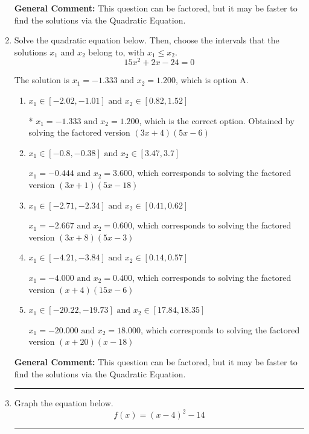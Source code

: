 \documentclass{extbook}[14pt]
\newcommand{\litem}[1]{\item #1

\rule{\textwidth}{0.4pt}}
\begin{document}
\begin{enumerate}
{\textbf{General Comment:} This question can be factored, but it may be faster to find the solutions via the Quadratic Equation.
}
\litem{
Solve the quadratic equation below. Then, choose the intervals that the solutions $x_1$ and $x_2$ belong to, with $x_1 \leq x_2$.
\[ 15x^{2} +2 x -24 = 0 \]

The solution is \( x_1 = -1.333 \text{ and } x_2 = 1.200 \), which is option A.\begin{enumerate}[label=\Alph*.]
\item \( x_1 \in [-2.02, -1.01] \text{ and } x_2 \in [0.82, 1.52] \)

* $x_1 = -1.333 \text{ and } x_2 = 1.200$, which is the correct option. Obtained by solving the factored version $(3x + 4)(5x -6)$
\item \( x_1 \in [-0.8, -0.38] \text{ and } x_2 \in [3.47, 3.7] \)

$x_1 = -0.444 \text{ and } x_2 = 3.600$, which corresponds to solving the factored version $(3x + 1)(5x -18)$
\item \( x_1 \in [-2.71, -2.34] \text{ and } x_2 \in [0.41, 0.62] \)

$x_1 = -2.667 \text{ and } x_2 = 0.600$, which corresponds to solving the factored version $(3x + 8)(5x -3)$
\item \( x_1 \in [-4.21, -3.84] \text{ and } x_2 \in [0.14, 0.57] \)

$x_1 = -4.000 \text{ and } x_2 = 0.400$, which corresponds to solving the factored version $(x + 4)(15x -6)$
\item \( x_1 \in [-20.22, -19.73] \text{ and } x_2 \in [17.84, 18.35] \)

$x_1 = -20.000 \text{ and } x_2 = 18.000$, which corresponds to solving the factored version $(x + 20)(x -18)$
\end{enumerate}

\textbf{General Comment:} This question can be factored, but it may be faster to find the solutions via the Quadratic Equation.
}
\litem{
Graph the equation below.
\[ f(x) = (x-4)^2 - 14 \]

}
\end{enumerate}
\end{document}
